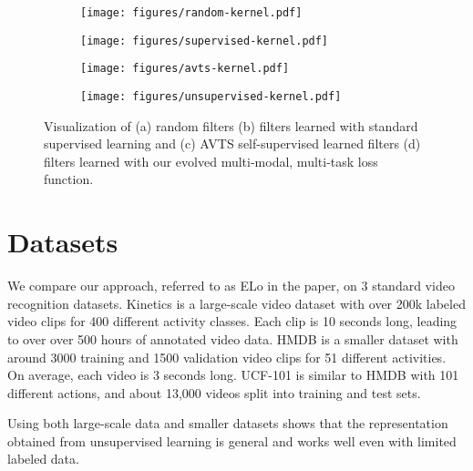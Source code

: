 \documentclass[10pt,twocolumn,letterpaper]{article}
\begin{document}
\begin{figure*}
\begin{subfigure}{.5\textwidth}
  \centering
    \texttt{[image: figures/random-kernel.pdf]}
  \caption{}
  \label{fig:filtersfig1}
\end{subfigure}\begin{subfigure}{.5\textwidth}
  \centering
    \texttt{[image: figures/supervised-kernel.pdf]}
  \caption{}
  \label{fig:filtersfig2}
\end{subfigure}
\begin{subfigure}{.5\textwidth}
  \centering
    \texttt{[image: figures/avts-kernel.pdf]}
  \caption{}
  \label{fig:filtersfig3}
\end{subfigure}\begin{subfigure}{.5\textwidth}
  \centering
    \texttt{[image: figures/unsupervised-kernel.pdf]}
  \caption{}
  \label{fig:filtersfig4}
\end{subfigure}
  \caption{Visualization of (a) random filters (b) filters learned with standard supervised learning and (c) AVTS \cite{korbar2018cooperative} self-supervised learned filters (d) filters learned with our evolved multi-modal, multi-task loss function.}
  \label{fig:filter-vis}
\end{figure*}









\section{Datasets}
We compare our approach, referred to as ELo in the paper, on 3 standard video recognition datasets. Kinetics \cite{carreira2017quo} is a large-scale video dataset with over 200k labeled video clips for 400 different activity classes. Each clip is 10 seconds long, leading to over over 500 hours of annotated video data. HMDB \cite{kuehne2011hmdb} is a smaller dataset with around 3000 training and 1500 validation video clips for 51 different activities. On average, each video is 3 seconds long. UCF-101 \cite{UCF101} is similar to HMDB with 101 different actions, and about 13,000 videos split into training and test sets.

Using both large-scale data and smaller datasets shows that the representation obtained from unsupervised learning is general and works well even with limited labeled data.
\end{document}
